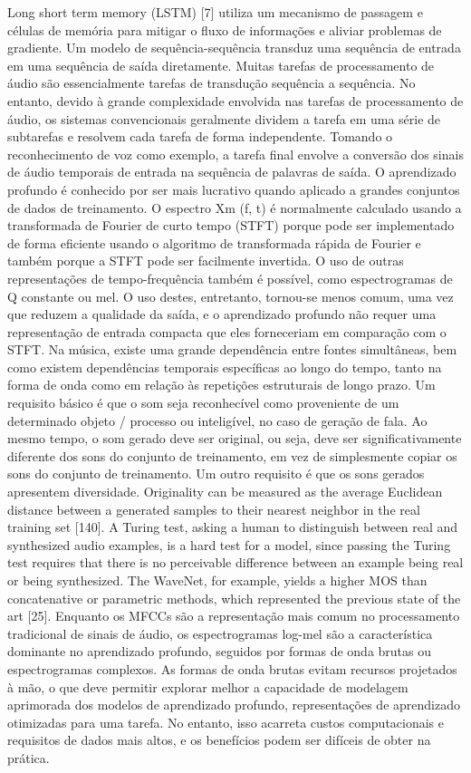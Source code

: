 \documentclass{article}
\begin{document}
Long short term memory (LSTM) [7] utiliza um mecanismo de passagem e células de memória para mitigar o fluxo de informações e aliviar problemas de gradiente.
Um modelo de sequência-sequência transduz uma sequência de entrada em uma sequência de saída diretamente. Muitas tarefas de processamento de áudio são essencialmente tarefas de transdução sequência a sequência. No entanto, devido à grande complexidade envolvida nas tarefas de processamento de áudio, os sistemas convencionais geralmente dividem a tarefa em uma série de subtarefas e resolvem cada tarefa de forma independente. Tomando o reconhecimento de voz como exemplo, a tarefa final envolve a conversão dos sinais de áudio temporais de entrada na sequência de palavras de saída.
O aprendizado profundo é conhecido por ser mais lucrativo quando aplicado a grandes conjuntos de dados de treinamento. O espectro Xm (f, t) é normalmente calculado usando a transformada de Fourier de curto tempo (STFT) porque pode ser implementado de forma eficiente usando o algoritmo de transformada rápida de Fourier e também porque a STFT pode ser facilmente invertida. O uso de outras representações de tempo-frequência também é possível, como espectrogramas de Q constante ou mel. O uso destes, entretanto, tornou-se menos comum, uma vez que reduzem a qualidade da saída, e o aprendizado profundo não requer uma representação de entrada compacta que eles forneceriam em comparação com o STFT.
Na música, existe uma grande dependência entre fontes simultâneas, bem como existem dependências temporais específicas ao longo do tempo, tanto na forma de onda como em relação às repetições estruturais de longo prazo.
Um requisito básico é que o som seja reconhecível como proveniente de um determinado objeto / processo ou inteligível, no caso de geração de fala. Ao mesmo tempo, o som gerado deve ser original, ou seja, deve ser significativamente diferente dos sons do conjunto de treinamento, em vez de simplesmente copiar os sons do conjunto de treinamento. Um outro requisito é que os sons gerados apresentem diversidade. Originality can be measured as the average  Euclidean distance between a generated samples to their nearest neighbor in the real training set [140]. A Turing test, asking  a human to distinguish between real and synthesized audio  examples, is a hard test for a model, since passing the Turing  test requires that there is no perceivable difference between  an example being real or being synthesized. The WaveNet,  for example, yields a higher MOS than concatenative or  parametric methods, which represented the previous state of  the art [25].
Enquanto os MFCCs são a representação mais comum no processamento tradicional de sinais de áudio, os espectrogramas log-mel são a característica dominante no aprendizado profundo, seguidos por formas de onda brutas ou espectrogramas complexos. As formas de onda brutas evitam recursos projetados à mão, o que deve permitir explorar melhor a capacidade de modelagem aprimorada dos modelos de aprendizado profundo, representações de aprendizado otimizadas para uma tarefa. No entanto, isso acarreta custos computacionais e requisitos de dados mais altos, e os benefícios podem ser difíceis de obter na prática.
\end{document}
